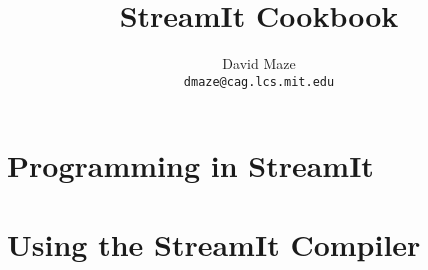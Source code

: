 \documentclass[11pt]{article}
\title{StreamIt Cookbook}
\author{David Maze\\\texttt{dmaze@cag.lcs.mit.edu}}
\begin{document}
\maketitle



\section{Programming in StreamIt}








\bigskip \section{Using the StreamIt Compiler}
\label{sec:compiler}


\appendix



\end{document}
